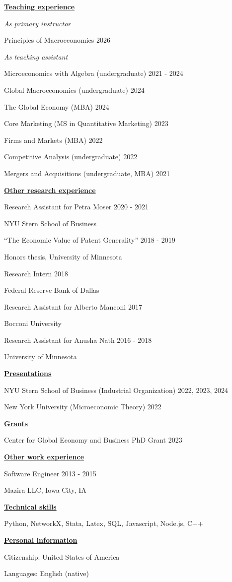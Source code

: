 \documentclass[11pt]{article}
\newcommand{\sect}[1]{\vspace{0.5em}\underline{\textbf{#1}}}
\begin{document}
\sect{Teaching experience}

\textit{As primary instructor}

Principles of Macroeconomics \hfill 2026

\textit{As teaching assistant}

Microeconomics with Algebra (undergraduate) \hfill 2021 - 2024

Global Macroeconomics (undergraduate) \hfill 2024

The Global Economy (MBA) \hfill 2024

Core Marketing (MS in Quantitative Marketing) \hfill 2023

Firms and Markets (MBA) \hfill 2022

Competitive Analysis (undergraduate) \hfill 2022

Mergers and Acquisitions (undergraduate, MBA) \hfill 2021

\sect{Other research experience}

Research Assistant for Petra Moser \hfill 2020 - 2021

\hspace{2em}NYU Stern School of Business

``The Economic Value of Patent Generality'' \hfill 2018 - 2019

\hspace{2em}Honors thesis, University of Minnesota

Research Intern \hfill 2018

\hspace{2em}Federal Reserve Bank of Dallas

Research Assistant for Alberto Manconi \hfill 2017

\hspace{2em}Bocconi University

Research Assistant for Anusha Nath \hfill 2016 - 2018

\hspace{2em}University of Minnesota

\sect{Presentations}

NYU Stern School of Business (Industrial Organization) \hfill 2022, 2023, 2024

New York University (Microeconomic Theory) \hfill 2022

\sect{Grants}

Center for Global Economy and Business PhD Grant \hfill 2023

\sect{Other work experience}

Software Engineer \hfill 2013 - 2015

Mazira LLC, Iowa City, IA

\sect{Technical skills}

Python, NetworkX, Stata, Latex, SQL, Javascript, Node.js, C++

\sect{Personal information}

Citizenship: United States of America

Languages: English (native)
\end{document}
